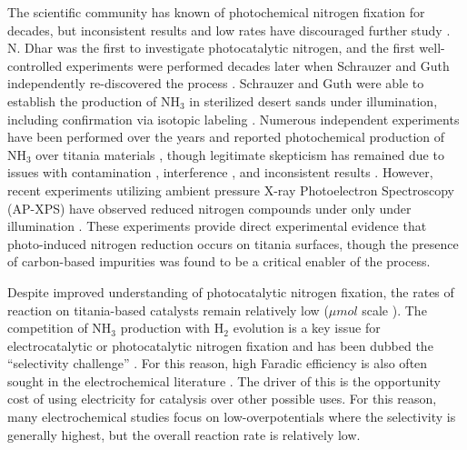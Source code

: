 The scientific community has known of photochemical nitrogen fixation for decades, but inconsistent results and low rates have discouraged further study \cite{Medford_2017}. N. Dhar \cite{Dhar_1941} was the first to investigate photocatalytic nitrogen, and the first well\hyp{}controlled experiments were performed decades later when Schrauzer and Guth independently re-discovered the process \cite{Schrauzer_1977}. Schrauzer and Guth were able to establish the production of NH$_3$ in sterilized desert sands under illumination, \cite{Schrauzer_1977} including confirmation via isotopic labeling \cite{Schrauzer_1983}. Numerous independent experiments have been performed over the years and reported photochemical production of NH$_3$ over titania materials \cite{Bickley_1979,Augugliaro_1982,Soria_1991,Li_2018,Yuan_2013,Hirakawa_2017}, though legitimate skepticism has remained due to issues with contamination \cite{edwards1992opinion, Davies1995, davies1993reply}, interference \cite{Gao_2018,Cui2018}, and inconsistent results \cite{Medford_2017}. However, recent experiments utilizing ambient pressure X\hyp{}ray Photoelectron Spectroscopy (AP\hyp{}XPS) have observed reduced nitrogen compounds under only under illumination \cite{Comer_2018b}. These experiments provide direct experimental evidence that photo\hyp{}induced nitrogen reduction occurs on titania surfaces, though the presence of carbon-based impurities was found to be a critical enabler of the process. %

Despite improved understanding of photocatalytic nitrogen fixation, the rates of reaction on titania-based catalysts remain relatively low ($\mu mol$ scale \cite{Hirakawa_2017}). The competition of NH$_3$ production with H$_2$ evolution is a key issue for electrocatalytic or photocatalytic nitrogen fixation and has been dubbed the ``selectivity challenge'' \cite{Singh_2017}. For this reason, high Faradic efficiency is also often sought in the electrochemical literature \cite{McPherson_2019}. The driver of this is the opportunity cost of using electricity for catalysis over other possible uses. For this reason, many electrochemical studies focus on low-overpotentials where the selectivity is generally highest, but the overall reaction rate is relatively low.

